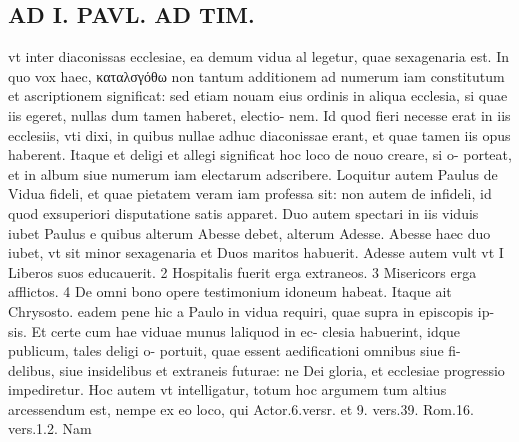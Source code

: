 \documentclass{article}
\begin{document}
\begin{pages}
\section*{AD I. PAVL. AD TIM. }
\marginpar{[ p.270 ]}\pstart vt inter diaconissas ecclesiae, ea demum vidua al legetur, quae sexagenaria est. In quo vox haec, καταλσγόθω non tantum additionem ad numerum iam constitutum et ascriptionem significat: sed etiam nouam eius ordinis in aliqua ecclesia, si quae iis egeret, nullas dum tamen haberet, electio- nem. Id quod fieri necesse erat in iis ecclesiis, vti dixi, in quibus nullae adhuc diaconissae erant, et quae tamen iis opus haberent. Itaque et deligi et allegi significat hoc loco de nouo creare, si o- porteat, et in album siue numerum iam electarum adscribere. Loquitur autem Paulus de Vidua fideli, et quae pietatem veram iam professa sit: non autem de infideli, id quod exsuperiori disputatione satis apparet. Duo autem spectari in iis viduis iubet Paulus e quibus alterum Abesse debet, alterum Adesse. Abesse haec duo iubet, vt sit minor sexagenaria et Duos maritos habuerit. Adesse autem vult vt I Liberos suos educauerit. 2 Hospitalis fuerit erga extraneos. 3 Misericors erga afflictos. 4 De omni bono opere testimonium idoneum habeat. Itaque ait Chrysosto. eadem pene hic a Paulo in vidua requiri, quae supra in episcopis ip- sis. Et certe cum hae viduae munus laliquod in ec- clesia habuerint, idque publicum, tales deligi o- portuit, quae essent aedificationi omnibus siue fi- delibus, siue insidelibus et extraneis futurae: ne Dei gloria, et ecclesiae progressio impediretur. Hoc autem vt intelligatur, totum hoc argumem tum altius arcessendum est, nempe ex eo loco, qui Actor.6.versr. et 9. vers.39. Rom.16. vers.1.2. Nam  \pend

\end{pages}
\end{document}
